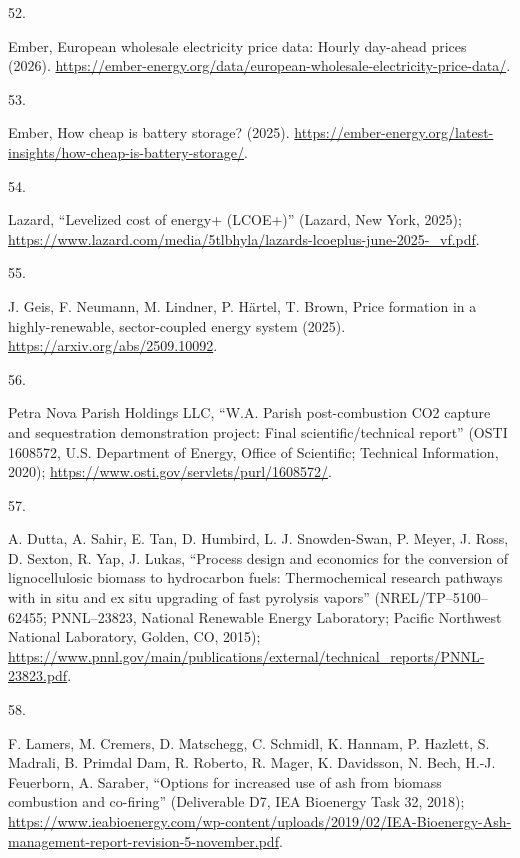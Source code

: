 \documentclass[
  letterpaper,
]{article}
\newlength{\cslhangindent}
\newlength{\csllabelwidth}
\newenvironment{CSLReferences}[2] %
 {\begin{list}{}{%
  \setlength{\itemindent}{0pt}
  \setlength{\leftmargin}{0pt}
  \setlength{\parsep}{0pt}
  \ifodd #1
   \setlength{\leftmargin}{\cslhangindent}
   \setlength{\itemindent}{-1\cslhangindent}
  \fi
  \setlength{\itemsep}{#2\baselineskip}}}
 {\end{list}}
\newcommand{\CSLLeftMargin}[1]{\parbox[t]{\csllabelwidth}{\strut#1\strut}}
\newcommand{\CSLRightInline}[1]{\parbox[t]{\linewidth - \csllabelwidth}{\strut#1\strut}}
\begin{document}
\begin{CSLReferences}{0}{1}
\CSLLeftMargin{52. }%
\CSLRightInline{Ember, European wholesale electricity price data: Hourly
day-ahead prices (2026).
\url{https://ember-energy.org/data/european-wholesale-electricity-price-data/}.}

\CSLLeftMargin{53. }%
\CSLRightInline{Ember, How cheap is battery storage? (2025).
\url{https://ember-energy.org/latest-insights/how-cheap-is-battery-storage/}.}

\CSLLeftMargin{54. }%
\CSLRightInline{Lazard, {``Levelized cost of energy+ (LCOE+)''} (Lazard,
New York, 2025);
\url{https://www.lazard.com/media/5tlbhyla/lazards-lcoeplus-june-2025-_vf.pdf}.}

\CSLLeftMargin{55. }%
\CSLRightInline{J. Geis, F. Neumann, M. Lindner, P. Härtel, T. Brown,
Price formation in a highly-renewable, sector-coupled energy system
(2025). \url{https://arxiv.org/abs/2509.10092}.}

\CSLLeftMargin{56. }%
\CSLRightInline{Petra Nova Parish Holdings LLC, {``{W.A. Parish}
post-combustion {CO2} capture and sequestration demonstration project:
Final scientific/technical report''} (OSTI 1608572, U.S. Department of
Energy, Office of Scientific; Technical Information, 2020);
\url{https://www.osti.gov/servlets/purl/1608572/}.}

\CSLLeftMargin{57. }%
\CSLRightInline{A. Dutta, A. Sahir, E. Tan, D. Humbird, L. J.
Snowden-Swan, P. Meyer, J. Ross, D. Sexton, R. Yap, J. Lukas, {``Process
design and economics for the conversion of lignocellulosic biomass to
hydrocarbon fuels: Thermochemical research pathways with in situ and ex
situ upgrading of fast pyrolysis vapors''} (NREL/TP--5100--62455;
PNNL--23823, National Renewable Energy Laboratory; Pacific Northwest
National Laboratory, Golden, CO, 2015);
\url{https://www.pnnl.gov/main/publications/external/technical_reports/PNNL-23823.pdf}.}

\CSLLeftMargin{58. }%
\CSLRightInline{F. Lamers, M. Cremers, D. Matschegg, C. Schmidl, K.
Hannam, P. Hazlett, S. Madrali, B. Primdal Dam, R. Roberto, R. Mager, K.
Davidsson, N. Bech, H.-J. Feuerborn, A. Saraber, {``Options for
increased use of ash from biomass combustion and co-firing''}
(Deliverable D7, IEA Bioenergy Task 32, 2018);
\url{https://www.ieabioenergy.com/wp-content/uploads/2019/02/IEA-Bioenergy-Ash-management-report-revision-5-november.pdf}.}


\end{CSLReferences}
\end{document}
